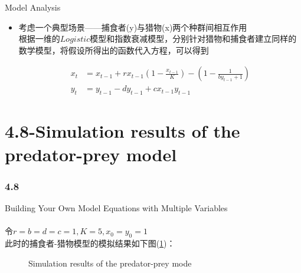\documentclass{beamer}
\begin{document}
\begin{frame}{Model Analysis \uppercase\expandafter{}}
 \begin{itemize}
     \item 考虑一个典型场景——捕食者(y)与猎物(x)两个种群间相互作用\\
     根据一维的$Logistic$模型和指数衰减模型，分别针对猎物和捕食者建立同样的数学模型，将假设所得出的函数代入方程，可以得到
      \begin{block}{}
		 \begin{equation*}
		  \begin{aligned}
			x_t&=x_{t-1}+rx_{t-1}(1-\frac{x_{t-1}}{K})-(1-\frac{1}{by_{t-1}+1})\\
			y_t&=y_{t-1}-dy_{t-1}+cx_{t-1}y_{t-1}
		  \end{aligned}
		 \end{equation*}
        \end{block}
 \end{itemize}
\end{frame}






\section{4.8-Simulation results of the predator-prey model}
    \begin{frame}
     \frametitle{4.8}
      Building Your Own Model Equations with Multiple Variables\\
      ~\\令$r=b=d=c=1,K=5,x_0=y_0=1$\\
      此时的捕食者-猎物模型的模拟结果如下图(\ref{fig1})：\\

    \begin{figure}
		\centering
		\hspace{0.4in}
		\caption{Simulation results of the predator-prey mode}
		\label{fig1}                      %
	\end{figure}
\end{frame}
\end{document}
